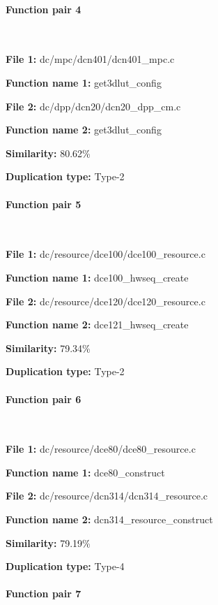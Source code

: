 \paragraph{Function pair 4 }  

\

\textbf{File 1:} dc/mpc/dcn401/dcn401\_mpc.c

\textbf{Function name 1:} get3dlut\_config

\textbf{File 2:} dc/dpp/dcn20/dcn20\_dpp\_cm.c

\textbf{Function name 2:} get3dlut\_config

\textbf{Similarity:} 80.62\%

\textbf{Duplication type:} Type-2


\paragraph{Function pair 5 }  

\

\textbf{File 1:} dc/resource/dce100/dce100\_resource.c

\textbf{Function name 1:} dce100\_hwseq\_create

\textbf{File 2:} dc/resource/dce120/dce120\_resource.c

\textbf{Function name 2:} dce121\_hwseq\_create

\textbf{Similarity:} 79.34\%

\textbf{Duplication type:} Type-2


\paragraph{Function pair 6 }  

\

\textbf{File 1:} dc/resource/dce80/dce80\_resource.c

\textbf{Function name 1:} dce80\_construct

\textbf{File 2:} dc/resource/dcn314/dcn314\_resource.c

\textbf{Function name 2:} dcn314\_resource\_construct

\textbf{Similarity:} 79.19\%

\textbf{Duplication type:} Type-4


\paragraph{Function pair 7 }  

\

